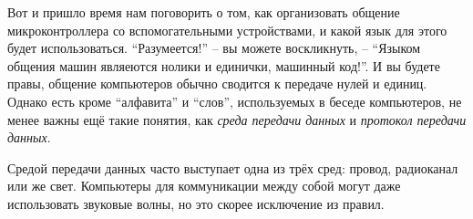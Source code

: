 \documentclass[../sparc.tex]{subfiles}
\begin{document}
Вот и пришло время нам поговорить о том, как организовать общение
микроконтроллера со вспомогательными устройствами, и какой язык для этого будет
использоваться.  ``Разумеется!'' -- вы можете воскликнуть, -- ``Языком общения
машин являеются нолики и единички, машинный код!''.  И вы будете правы, общение
компьютеров обычно сводится к передаче нулей и единиц.  Однако есть кроме
``алфавита'' и ``слов'', используемых в беседе компьютеров, не менее важны ещё
такие понятия, как \emph{среда передачи данных} и \emph{протокол передачи
данных}.

Средой передачи данных часто выступает одна из трёх сред: провод, радиоканал или
же свет.  Компьютеры для коммуникации между собой могут даже использовать
звуковые волны, но это скорее исключение из правил.
\end{document}
